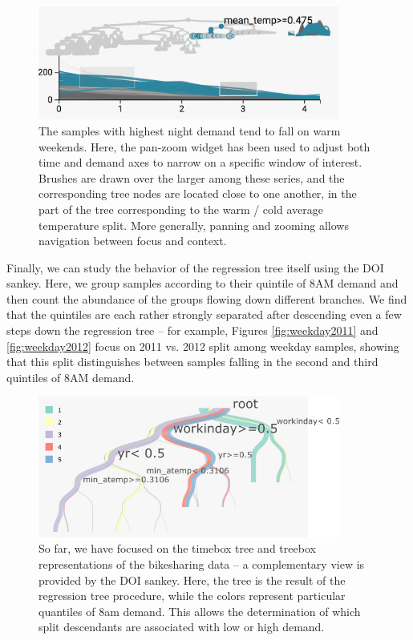 \begin{figure}

{\centering \includegraphics[width=375px]{figure/treelapse/warm_weekend}

}

\caption{The samples with highest night demand tend to fall on warm
  weekends. Here, the pan-zoom widget has been used to adjust both time and
  demand axes to narrow on a specific window of interest. Brushes are drawn over
  the larger among these series, and the corresponding tree nodes are located
  close to one another, in the part of the tree corresponding to the warm / cold
  average temperature split. More generally, panning and zooming allows
  navigation between focus and context.}\label{fig:warmweekend}
\end{figure}

Finally, we can study the behavior of the regression tree itself using
the DOI sankey. Here, we group samples according to their quintile of
8AM demand and then count the abundance of the groups flowing down
different branches. We find that the quintiles are each rather strongly
separated after descending even a few steps down the regression tree --
for example, Figures \ref{fig:weekday2011} and \ref{fig:weekday2012}
focus on 2011 vs. 2012 split among weekday samples, showing that this
split distinguishes between samples falling in the second and third
quintiles of 8AM demand.

\begin{figure}

{\centering \includegraphics[width=375px]{figure/treelapse/bike_sankey}

}

\caption{So far, we have focused on the timebox tree and treebox representations
  of the bikesharing data -- a complementary view is provided by the DOI sankey.
  Here, the tree is the result of the regression tree procedure, while the
  colors represent particular quantiles of 8am demand. This allows the
  determination of which split descendants are associated with low or high
  demand.}\label{fig:bikesankey}
\end{figure}

